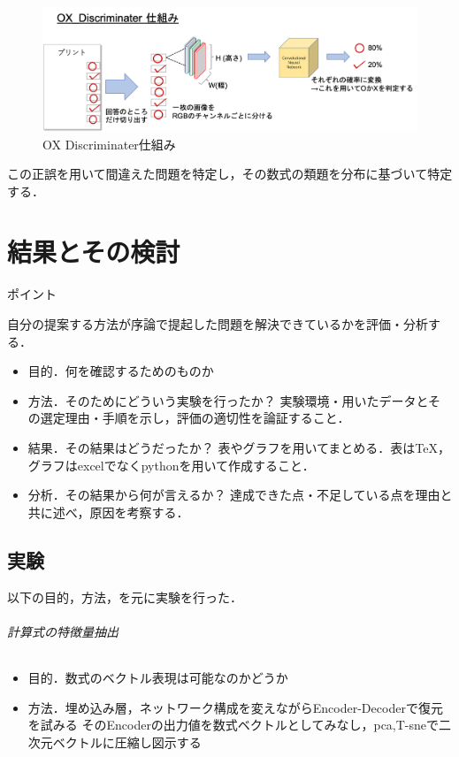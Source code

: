 \documentclass[a4j,11pt,report]{jsbook}
\newcommand{\point}[1]{
\begin{itembox}[l]{ポイント}
  #1
\end{itembox}
}
\begin{document}
\begin{center}
  \begin{figure}[htb]
    \centering
    \includegraphics[width=\linewidth]{image/OX_Discriminater.png}
    \caption{OX Discriminater仕組み}
    \label{fig:Discriminater_simple}
  \end{figure}
\end{center}

この正誤を用いて間違えた問題を特定し，その数式の類題を分布に基づいて特定する．






\chapter{結果とその検討 \label{ch:result}}
\point{
自分の提案する方法が序論で提起した問題を解決できているかを評価・分析する．
\begin{itemize}
  \item 目的．何を確認するためのものか
  \item 方法．そのためにどういう実験を行ったか？ 実験環境・用いたデータとその選定理由・手順を示し，評価の適切性を論証すること．
  \item 結果．その結果はどうだったか？ 表やグラフを用いてまとめる．表はTeX，グラフはexcelでなくpythonを用いて作成すること．
  \item 分析．その結果から何が言えるか？ 達成できた点・不足している点を理由と共に述べ，原因を考察する．
\end{itemize}
}
\fi

\section{実験}
以下の目的，方法，を元に実験を行った．
\subparagraph{計算式の特徴量抽出}
\begin{itemize}
  \item 目的．数式のベクトル表現は可能なのかどうか
  \item 方法．埋め込み層，ネットワーク構成を変えながらEncoder-Decoderで復元を試みる
  そのEncoderの出力値を数式ベクトルとしてみなし，pca,T-sneで二次元ベクトルに圧縮し図示する
\end{itemize}
\end{document}
